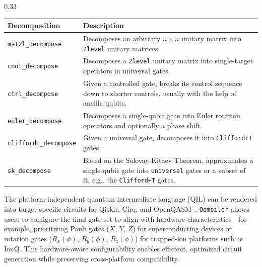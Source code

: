 \documentclass[final]{beamer}
\let\oldblock\block
\let\endoldblock\endblock
\renewenvironment{block}[1]{
    \vspace{2em} %
    \oldblock{#1}
    }{
    \endoldblock   %
}
\begin{document}
\begin{frame}[t]
\begin{columns}[t]
\begin{column}{0.33\textwidth}
\begin{block}{Methodology}
                    \vspace{2em}
                    \begin{tabularx}{.9\textwidth}{lX}
                        \hline
                        \textbf{Decomposition}        & \textbf{Description}                                                                                                                                        \\
                        \hline
                        \texttt{mat2l\_decompose}     & Decomposes an arbitrary $n \times n$ unitary matrix into \texttt{2level} unitary matrices.                                                                  \\
                        \texttt{cnot\_decompose}      & Decomposes a \texttt{2level} unitary matrix into single-target operators in universal gates.                                                                \\
                        \texttt{ctrl\_decompose}      & Given a controlled gate, breaks its control sequence down to shorter controls, usually with the help of ancilla qubits.                                     \\
                        \texttt{euler\_decompose}     & Decomposes a single-qubit gate into Euler rotation operators and optionally a phase shift.                                                                  \\
                        \texttt{cliffordt\_decompose} & Given a universal gate, decomposes it into \texttt{Clifford+T} gates.                                                                                       \\
                        \texttt{sk\_decompose}        & Based on the Solovay-Kitaev Theorem, approximates a single-qubit gate into \texttt{universal} gates or a subset of it, e.g., the \texttt{Clifford+T} gates. \\
                        \hline
                    \end{tabularx}
                    \vspace{2em}


                    The platform-independent quantum intermediate language (QIL) can be rendered into target-specific circuits
                    for Qiskit, Cirq, and OpenQASM~\cite{openqasm2,openqasm3}. \texttt{Qompiler} allows users to configure
                    the final gate set to align with hardware characteristics—for example, prioritizing Pauli gates
                    ($X$, $Y$, $Z$) for superconducting devices or rotation gates ($R_x(\phi)$, $R_y(\phi)$, $R_z(\phi)$)
                    for trapped-ion platforms such as IonQ. This hardware-aware configurability enables efficient, optimized
                    circuit generation while preserving cross-platform compatibility.



\end{block}
\end{column}
\end{columns}
\end{frame}
\end{document}
